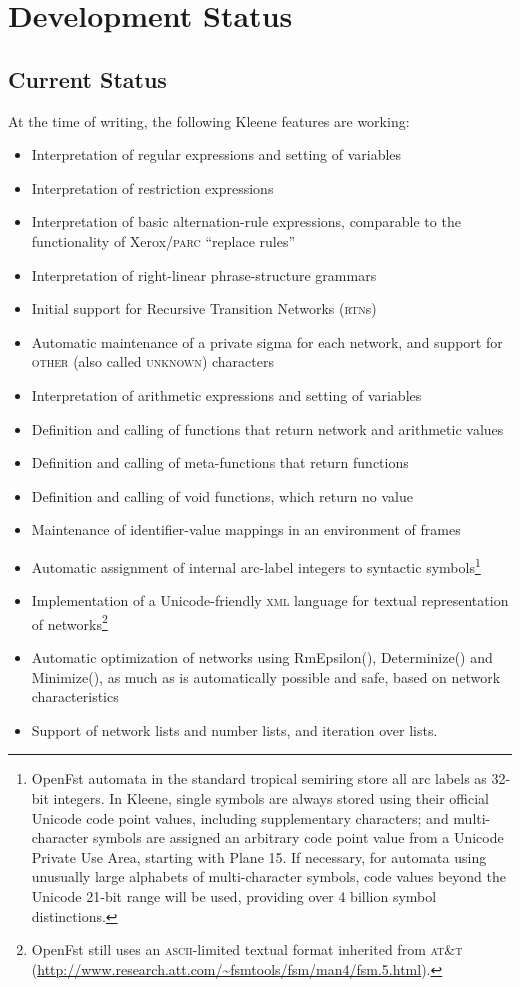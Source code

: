\documentclass[letterpaper,12pt]{article}
\newcommand{\Kleene}{Kleene\xspace}
\newcommand{\acro}{\textsc}
\begin{document}
 
\section{Development Status}

\subsection{Current Status}

At the time of writing, the following \Kleene{} features are working:

\begin{itemize}
\item
Interpretation of regular expressions and setting of variables
\item
Interpretation of restriction expressions
\item
Interpretation of basic alternation-rule expressions, comparable to
the functionality of Xerox/\acro{parc} ``replace rules''
\item
Interpretation of right-linear phrase-structure grammars
\item
Initial support for Recursive Transition Networks (\acro{rtn}s)
\item
Automatic maintenance of a private sigma for each network, and support
for \acro{other} (also called \acro{unknown}) characters
\item
Interpretation of arithmetic expressions and setting of variables
\item
Definition and calling of functions that return network and arithmetic values
\item
Definition and calling of meta-functions that return functions
\item
Definition and calling of void functions, which return no value
\item
Maintenance of identifier-value mappings in an environment of frames
\item
Automatic assignment of internal arc-label integers to syntactic
symbols\footnote{OpenFst automata in the standard tropical
semiring
store all arc labels as 32-bit integers.  In \Kleene{}, single symbols are always stored using their
official Unicode code point values, including supplementary characters; and
multi-character symbols are assigned an arbitrary code point value from
a Unicode Private Use Area, starting with Plane 15.  If necessary, for
automata using unusually
large alphabets of multi-character symbols, code values beyond the Unicode
21-bit range will be used, providing over 4 billion symbol distinctions.}
\item
Implementation of a Unicode-friendly \acro{xml} language for textual representation of
networks\footnote{OpenFst still uses an \acro{ascii}-limited textual format inherited from
\acro{at\&t} (\url{http://www.research.att.com/~fsmtools/fsm/man4/fsm.5.html}).}
\item
Automatic optimization of networks using RmEpsilon(), Determinize() and Minimize(), as much
as is automatically possible and safe, based on network characteristics
\item
Support of network lists and number lists, and iteration over lists.
\end{itemize}
\end{document}
